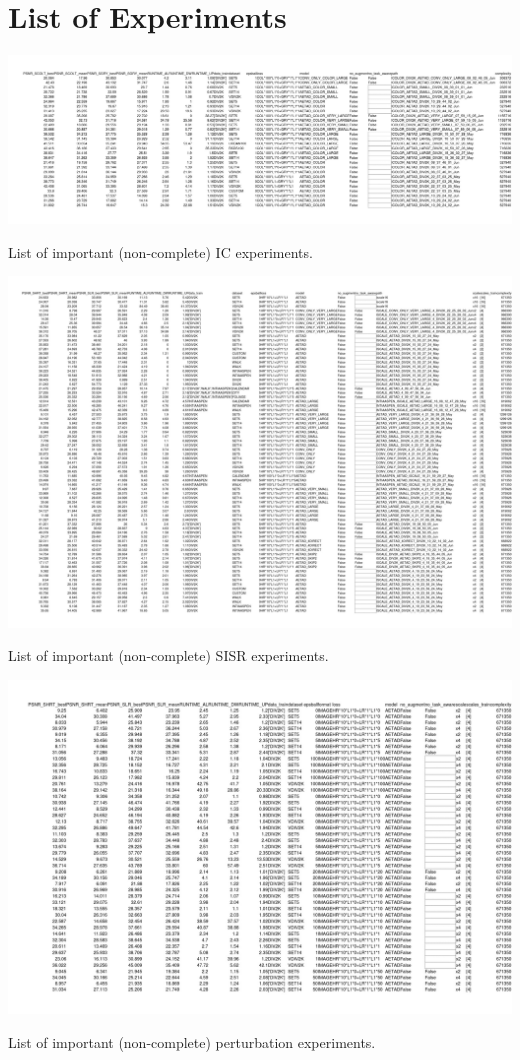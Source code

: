 \clearpage
\section*{List of Experiments}

\begin{table}[!ht]
\centering
\includegraphics[width=16cm]{figures/data_ic}
\caption{List of important (non-complete) \ac{IC} experiments.}
\label{table:experiments_ic}
\end{table}

\begin{table}[!ht]
\centering
\includegraphics[width=16cm]{figures/data_sisr}
\caption{List of important (non-complete) \ac{SISR} experiments.}
\label{table:experiments_sisr}
\end{table}

\begin{table}[!ht]
\centering
\includegraphics[width=16cm]{figures/data_epsilon_ball.jpg}
\caption{List of important (non-complete) perturbation experiments.}
\label{table:experiments_epsilon}
\end{table}